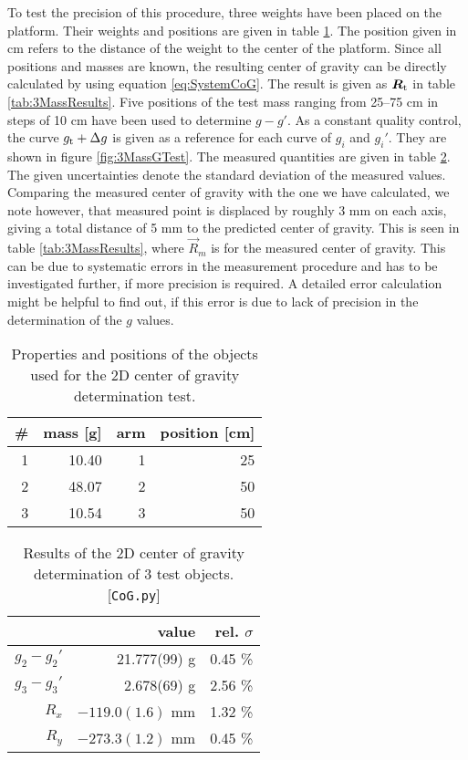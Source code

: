 \documentclass[journal]{IEEEtran}
\begin{document}
To test the precision of this procedure, three weights have been placed on the platform.
Their weights and positions are given in table \ref{tab:3Mass}. The position given in cm refers to the distance of the weight to the center of the platform.
Since all positions and masses are known, the resulting center of gravity can be directly calculated by using equation \eqref{eq:SystemCoG}. The result is given as $\vec{R}_{\textup{t}}$ in table \ref{tab:3MassResults}.
Five positions of the test mass ranging from 25--75 cm in steps of 10 cm have been used to determine $g-g'$.
As a constant quality control, the curve $g_{\textup{t}} + \Delta g$ is given as a reference for each curve of $g_i$ and $g_i'$. They are shown in figure \ref{fig:3MassGTest}.
The measured quantities are given in table \ref{tab:3MassValues}. The given uncertainties denote the standard deviation of the measured values.
Comparing the measured center of gravity with the one we have calculated, we note however, that measured point is displaced by roughly 3 mm on each axis, giving a total distance of 5 mm  to the predicted center of gravity. This is seen in table \ref{tab:3MassResults}, where $\vec{R}_m$ is for the measured center of gravity.
This can be due to systematic errors in the measurement procedure and has to be investigated further, if more precision is required. A detailed error calculation might be helpful to find out, if this error is due to lack of precision in the determination of the $g$ values.

\begin{table}
	\centering
	\begin{tabular}{r | r r r}
		\# & mass [g] & arm & position [cm] \\
		\hline
		1	&	10.40	&	1	&	25	\\
		2	&	48.07	&	2	&	50	\\
		3	&	10.54	&	3	&	50	\\
	\end{tabular}
	\caption{Properties and positions of the objects used for the 2D center of gravity determination test.}
	\label{tab:3Mass}
\end{table}

\begin{table}
	\centering
	\begin{tabular}{r | r r}
		& value & rel. $\sigma$ \\
		\hline
		$g_2 - g_2'$	&	21.777(99) g & 0.45 \% \\
		$g_3 - g_3'$	&	2.678(69) g & 2.56 \% \\
		$R_x$	&	$-119.0(1.6)$ mm & 1.32 \% \\
		$R_y$	&	$-273.3(1.2)$ mm & 0.45 \% \\
	\end{tabular}
\caption{Results of the 2D center of gravity determination of 3 test objects. [\texttt{CoG.py}]}
	\label{tab:3MassValues}
\end{table}
\end{document}
